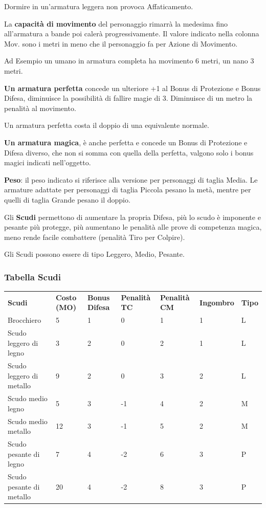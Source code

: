 \documentclass[a4paper,11pt,twoside,openany]{book}
\begin{document}
{Dormire in un'armatura leggera non provoca Affaticamento.

La \textbf{capacità di movimento} del personaggio rimarrà la medesima fino all'armatura a bande poi calerà progressivamente. Il valore indicato nella colonna Mov. sono i metri in meno che il personaggio fa per Azione di Movimento.

Ad Esempio un umano in armatura completa ha movimento 6 metri, un nano 3 metri. 

\textbf{Un armatura perfetta} concede un ulteriore +1 al Bonus di Protezione e Bonus Difesa, diminuisce la possibilità di fallire magie di 3. Diminuisce di un metro la penalità al movimento. 

Un armatura perfetta costa il doppio di una equivalente normale.

\textbf{Un armatura magica}, è anche perfetta e concede un Bonus di Protezione e Difesa diverso, che non si somma con quella della perfetta, valgono solo i bonus magici indicati nell'oggetto.

\textbf{Peso}: il peso indicato si riferisce alla versione per personaggi di taglia Media. Le armature adattate per personaggi di taglia Piccola pesano la metà, mentre per quelli di taglia Grande pesano il doppio.

\pagebreak

Gli \textbf{Scudi} permettono di aumentare la propria Difesa, più lo scudo è imponente e pesante più protegge, più aumentano le penalità alle prove di competenza magica, meno rende facile combattere (penalità Tiro per Colpire).

Gli Scudi possono essere di tipo Leggero, Medio, Pesante.

\subsubsection{Tabella Scudi}

\label{tabella-scudi}
\medskip
\begin{tabular}{lllllll}
\toprule
\textbf{Scudi} & \textbf{Costo (MO)} & \textbf{Bonus Difesa} & \textbf{Penalità TC} & \textbf{Penalità CM} & \textbf{Ingombro} & \textbf{Tipo}\tabularnewline
Brocchiero & 5 & 1 & 0 & 1 & 1 &L\tabularnewline
Scudo leggero di legno & 3 & 2 & 0 & 2 & 1 &L\tabularnewline
Scudo leggero di metallo & 9 & 2 & 0 & 3 & 2 &L\tabularnewline
Scudo medio legno & 5 & 3 & -1 & 4 & 2 &M\tabularnewline
Scudo medio metallo & 12 & 3 & -1 & 5 & 2 &M\tabularnewline
Scudo pesante di legno & 7 & 4 & -2 & 6 & 3 &P\tabularnewline
Scudo pesante di metallo & 20 & 4 & -2 & 8 & 3 & P\tabularnewline
\end{tabular}

}
\end{document}
